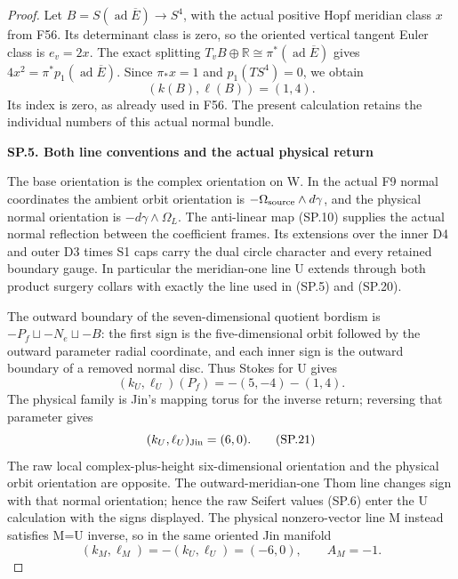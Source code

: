 \begin{proof}
Let \(B=S(\operatorname{ad}\overline E)\to S^4\), with the
actual positive Hopf meridian class \(x\) from F56. Its determinant
class is zero, so the oriented vertical tangent Euler class is
\(e_v=2x\). The exact splitting
\(T_vB\oplus\mathbb R\cong\pi^*(\operatorname{ad}\overline E)\)
gives \(4x^2=\pi^*p_1(\operatorname{ad}\overline E)\).
Since \(\pi_*x=1\) and \(p_1(TS^4)=0\), we obtain
\[
                         (k(B),\ell(B))=(1,4).             \tag{SP.20}
\]
Its index is zero, as already used in F56. The present calculation
retains the individual numbers of this actual normal bundle.

\par

\medskip\noindent\textbf{SP.5. Both line conventions and the actual physical return}

\par\nobreak

The base orientation is the complex orientation on W. In the actual
F9 normal coordinates the ambient orbit orientation is
\(-\Omega_{\rm source}\wedge d\gamma\), and the physical normal
orientation is \(-d\gamma\wedge\Omega_L\). The anti-linear map
(SP.10) supplies the actual normal reflection between the coefficient
frames. Its extensions over the inner D4 and outer D3 times S1 caps
carry the dual circle character and every retained boundary gauge.
In particular the meridian-one line U extends through both product
surgery collars with exactly the line used in (SP.5) and (SP.20).

The outward boundary of the seven-dimensional quotient bordism is
\(-P_f\sqcup-N_e\sqcup-B\): the first sign is the five-dimensional
orbit followed by the outward parameter radial coordinate, and each
inner sign is the outward boundary of a removed normal disc. Thus
Stokes for U gives
\[
 (k_U,\ell_U)(P_f)=-(5,-4)-(1,4).
\]
The physical family is Jin's mapping torus for the inverse return;
reversing that parameter gives
\[
                (k_U,\ell_U)_{\rm Jin}=(6,0).
                                                        \tag{SP.21}
\]
The raw local complex-plus-height six-dimensional orientation and the
physical orbit orientation are opposite. The outward-meridian-one
Thom line changes sign with that normal orientation; hence the raw
Seifert values (SP.6) enter the U calculation with the signs displayed.
The physical nonzero-vector line M instead satisfies M=U inverse,
so in the same oriented Jin manifold
\[
           (k_M,\ell_M)=-(k_U,\ell_U)=(-6,0),
           \qquad A_M=-1.                              \tag{SP.22}
\]


\end{proof}
